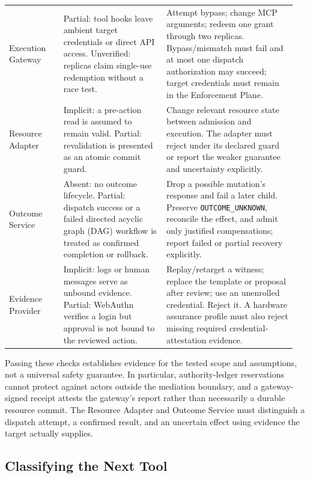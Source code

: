 {\begin{longtable}{@{}L{0.18\linewidth}L{0.34\linewidth}L{0.43\linewidth}@{}}
\addlinespace
Execution Gateway & Partial: tool hooks leave ambient target credentials or direct API access. Unverified: replicas claim single-use redemption without a race test. & Attempt bypass; change MCP arguments; redeem one grant through two replicas. Bypass/mismatch must fail and at most one dispatch authorization may succeed; target credentials must remain in the Enforcement Plane.\\
\addlinespace
Resource Adapter & Implicit: a pre-action read is assumed to remain valid. Partial: revalidation is presented as an atomic commit guard. & Change relevant resource state between admission and execution. The adapter must reject under its declared guard or report the weaker guarantee and uncertainty explicitly.\\
\addlinespace
Outcome Service & Absent: no outcome lifecycle. Partial: dispatch success or a failed directed acyclic graph (DAG) workflow is treated as confirmed completion or rollback. & Drop a possible mutation's response and fail a later child. Preserve \texttt{OUTCOME\_UNKNOWN}, reconcile the effect, and admit only justified compensations; report failed or partial recovery explicitly.\\
\addlinespace
Evidence Provider & Implicit: logs or human messages serve as unbound evidence. Partial: WebAuthn verifies a login but approval is not bound to the reviewed action. & Replay/retarget a witness; replace the template or proposal after review; use an unenrolled credential. Reject it. A hardware assurance profile must also reject missing required credential-attestation evidence.\\
\end{longtable}
}

Passing these checks establishes evidence for the tested scope and assumptions, not a universal safety guarantee. In particular, authority-ledger reservations cannot protect against actors outside the mediation boundary, and a gateway-signed receipt attests the gateway's report rather than necessarily a durable resource commit. The Resource Adapter and Outcome Service must distinguish a dispatch attempt, a confirmed result, and an uncertain effect using evidence the target actually supplies.

\subsection{Classifying the Next Tool}

